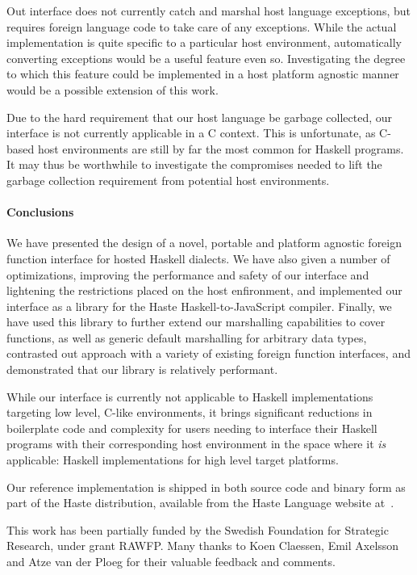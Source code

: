 \documentclass{sigplanconf}
\begin{document}
Out interface does not currently catch and marshal host language
exceptions, but requires foreign language code to take care of any exceptions.
While the actual implementation is quite specific to a particular
host environment, automatically converting exceptions would be a useful feature
even so. Investigating the degree to which this feature could be implemented
in a host platform agnostic manner would be a possible extension of this work.

Due to the hard requirement that our host language be garbage collected,
our interface is not currently applicable in a C context. This is unfortunate,
as C-based host environments are still by far the most common for Haskell
programs. It may thus be worthwhile to investigate the compromises needed
to lift the garbage collection requirement from potential host environments.

\paragraph{Conclusions}
We have presented the design of a novel, portable and platform agnostic foreign
function interface for hosted Haskell dialects. We have also given a number of
optimizations, improving the performance and safety of our interface
and lightening the restrictions placed on the host enfironment, and implemented
our interface as a library for the Haste Haskell-to-JavaScript compiler.
Finally, we have used this library to further extend our marshalling
capabilities to cover functions, as well as generic default marshalling for
arbitrary data types, contrasted out approach with a variety of existing
foreign function interfaces, and demonstrated that our library is relatively
performant.

While our interface is currently not applicable to Haskell implementations
targeting low level, C-like environments, it brings significant reductions in
boilerplate code and complexity for users needing to interface their Haskell
programs with their corresponding host environment in the space where it
\emph{is} applicable: Haskell implementations for high level target platforms.

Our reference implementation is shipped in both source code and binary form as
part of the Haste distribution, available from the Haste Language website
at\ \cite{haste-lang.org}.

\acks
This work has been partially funded by the Swedish Foundation for Strategic Research, under grant RAWFP. Many thanks to Koen Claessen, Emil Axelsson and Atze van der Ploeg for their valuable feedback and comments.
\end{document}
